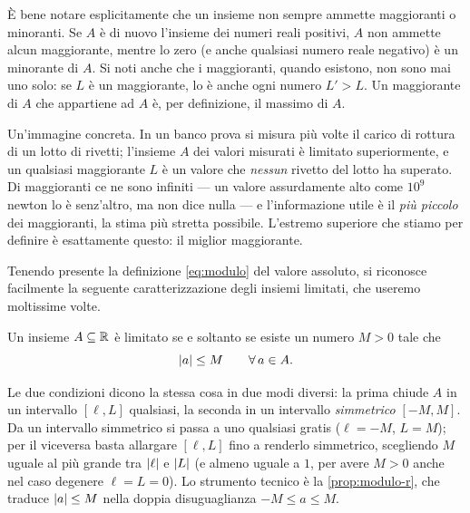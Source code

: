 È bene notare esplicitamente che un insieme non sempre ammette maggioranti o minoranti.
Se $A$ è di nuovo l'insieme dei numeri reali positivi, $A$ non ammette alcun maggiorante,
mentre lo zero (e anche qualsiasi numero reale negativo) è un minorante di $A$. Si noti
anche che i maggioranti, quando esistono, non sono mai uno solo: se $L$ è un maggiorante,
lo è anche ogni numero $L'>L$. Un maggiorante di $A$ che appartiene ad $A$ è, per
definizione, il massimo di $A$.

\begin{idea}
Un'immagine concreta. In un banco prova si misura più volte il carico di rottura di un
lotto di rivetti; l'insieme $A$ dei valori misurati è limitato superiormente, e un
qualsiasi maggiorante $L$ è un valore che \emph{nessun} rivetto del lotto ha superato.
Di maggioranti ce ne sono infiniti --- un valore assurdamente alto come $10^{9}$ newton lo
è senz'altro, ma non dice nulla --- e l'informazione utile è il \emph{più piccolo} dei
maggioranti, la stima più stretta possibile. L'estremo superiore che stiamo per definire
è esattamente questo: il miglior maggiorante.
\end{idea}

Tenendo presente la definizione \eqref{eq:modulo} del valore assoluto, si riconosce
facilmente la seguente caratterizzazione degli insiemi limitati, che useremo
moltissime volte.

\begin{proposizione}\label{prop:limitato-modulo}
Un insieme $A\subseteq\mathbb{R}$ è limitato se e soltanto se esiste un numero $M>0$ tale che
\begin{equation}\label{eq:limitato-modulo}
  \lvert a\rvert\le M \qquad \forall\, a\in A.
\end{equation}
\end{proposizione}

\begin{schema}
\end{schema}

\begin{strategia}
Le due condizioni dicono la stessa cosa in due modi diversi: la prima chiude $A$ in un
intervallo $[\ell,L]$ qualsiasi, la seconda in un intervallo \emph{simmetrico} $[-M,M]$.
Da un intervallo simmetrico si passa a uno qualsiasi gratis ($\ell=-M$, $L=M$); per il
viceversa basta allargare $[\ell,L]$ fino a renderlo simmetrico, scegliendo $M$ uguale al
più grande tra $\lvert \ell\rvert$ e $\lvert L\rvert$ (e almeno uguale a $1$, per avere $M>0$ anche
nel caso degenere $\ell=L=0$). Lo strumento tecnico è la
\cref{prop:modulo-r}, che traduce $\lvert a\rvert\le M$ nella doppia disuguaglianza
$-M\le a\le M$.
\end{strategia}

